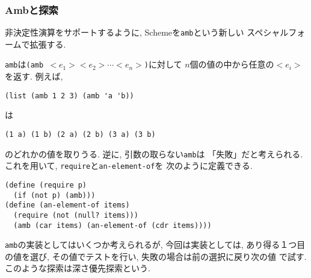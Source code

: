 \subsubsection{Ambと探索}
非決定性演算をサポートするように, Schemeを\lstinline{amb}という新しい
スペシャルフォームで拡張する.

\lstinline{amb}は{\tt (amb $<e_1> <e_2> \cdots <e_n>$)}に対して
$n$個の値の中から任意の$<e_i>$を返す. 例えば,

\begin{lstlisting}[basicstyle=\footnotesize]
(list (amb 1 2 3) (amb 'a 'b))
\end{lstlisting}

は

\begin{lstlisting}[basicstyle=\footnotesize]
(1 a) (1 b) (2 a) (2 b) (3 a) (3 b)
\end{lstlisting}

のどれかの値を取りうる. 逆に, 引数の取らない\lstinline{amb}は
「失敗」だと考えられる. これを用いて, \lstinline{require}と\lstinline{an-element-of}を
次のように定義できる.

\begin{lstlisting}[basicstyle=\footnotesize]
(define (require p)
  (if (not p) (amb)))
(define (an-element-of items)
  (require (not (null? items)))
  (amb (car items) (an-element-of (cdr items))))
\end{lstlisting}

\lstinline{amb}の実装としてはいくつか考えられるが, 今回は実装としては,
あり得る１つ目の値を選び, その値でテストを行い, 失敗の場合は前の選択に戻り次の値
で試す. このような探索は深さ優先探索という.